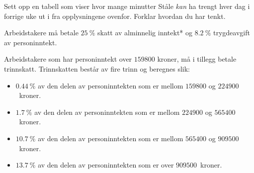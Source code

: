 \begin{oppgaver}
   Sett opp en tabell som viser hvor mange minutter Ståle \emph{kan}
    ha trengt hver dag i forrige uke ut i fra opplysningene ovenfor. Forklar
    hvordan du har tenkt.
\end{oppgaver}


\Oppgave[8]

Arbeidstakere må betale $\SI{25}{\percent}$ skatt av alminnelig inntekt* og
$\SI{8.2}{\percent}$ trygdeavgift av personinntekt.

Arbeidstakere som har personinntekt over $\num{159800}$ kroner, må i tillegg
betale trinnskatt. Trinnskatten består av fire trinn og beregnes slik:

\begin{itemize}
  \item $\SI{0.44}{\percent}$ av den delen av personinntekten som er mellom
    $\num{159800}$ og $\num{224900}$~kroner.
  \item $\SI{1.7}{\percent}$ av den delen av personinntekten som er mellom
    $\num{224900}$ og $\num{565400}$~kroner.
  \item $\SI{10.7}{\percent}$ av den delen av personinntekten som er mellom
    $\num{565400}$ og $\num{909500}$~kroner.
  \item $\SI{13.7}{\percent}$ av den delen av personinntekten som er over
    $\num{909500}$~kroner.
\end{itemize}

